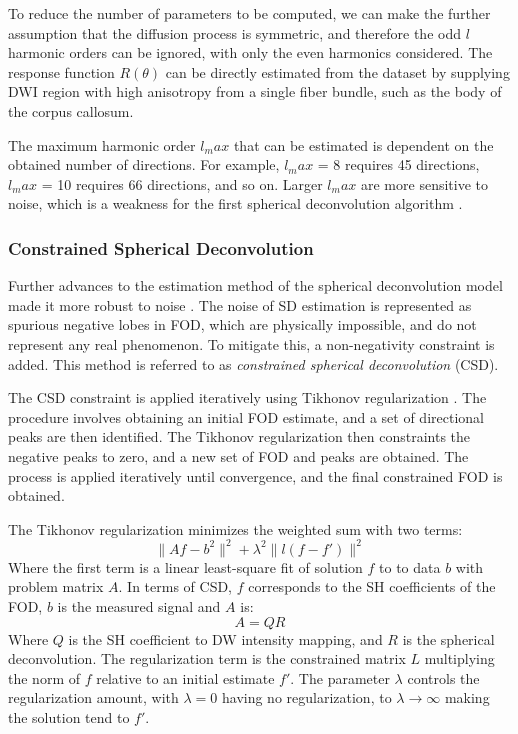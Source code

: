 To reduce the number of parameters to be computed, we can make the further assumption that the diffusion process is symmetric, and therefore the odd $l$ harmonic orders can be ignored, with only the even harmonics considered. 
The response function $R(\theta)$ can be directly estimated from the dataset by supplying DWI region with high anisotropy from a single fiber bundle, such as the body of the corpus callosum. 

The maximum harmonic order $l_max$ that can be estimated is dependent on the obtained number of directions. For example, $l_max$ = 8 requires 45 directions, $l_max$ = 10 requires 66 directions, and so on. Larger $l_max$ are more sensitive to noise, which is a weakness for the first spherical deconvolution algorithm \cite{Tournier2004}. 

\subsubsection{Constrained Spherical Deconvolution}
Further advances to the estimation method of the spherical deconvolution model made it more robust to noise \cite{Tournier2007b}. The noise of SD estimation is represented as spurious negative lobes in FOD, which are physically impossible, and do not represent any real phenomenon. To mitigate this, a non-negativity constraint is added. This method is referred to as \textit{constrained spherical deconvolution} (CSD). 

The CSD constraint is applied iteratively using Tikhonov regularization \cite{Hansen1998}. The procedure involves obtaining an initial FOD estimate, and a set of directional peaks are then identified. The Tikhonov regularization then constraints the negative peaks to zero, and a new set of FOD and peaks are obtained. The process is applied iteratively until convergence, and the final constrained FOD is obtained. 

The Tikhonov regularization minimizes the weighted sum with two terms:
\begin{equation}
\|{Af - b}^2\|^2 + \lambda^2 \| l(f - f')\|^2
\end{equation}
Where the first term is a linear least-square fit of solution $f$ to to data $b$ with problem matrix $A$. 
In terms of CSD, $f$ corresponds to the SH coefficients of the FOD, $b$ is the measured signal and $A$ is:
\begin{equation}
A = QR
\end{equation}
Where $Q$ is the SH coefficient to DW intensity mapping, and $R$ is the spherical deconvolution. 
The regularization term is the constrained matrix $L$ multiplying the norm of $f$ relative to an initial estimate $f'$. The parameter $\lambda$ controls the regularization amount, with $\lambda=0$ having no regularization, to $\lambda\rightarrow \infty $ making the solution tend to $f'$. 

